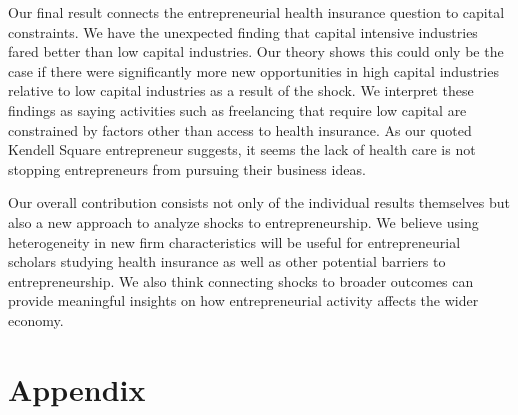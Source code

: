\documentclass[12pt]{article}
\begin{document}
Our final result connects the entrepreneurial health insurance question to capital constraints. We have the unexpected finding that capital intensive industries fared better than low capital industries. Our theory shows this could only be the case if there were significantly more new opportunities in high capital industries relative to low capital industries as a result of the shock. We interpret these findings as saying activities such as freelancing that require low capital are constrained by factors other than access to health insurance. As our quoted Kendell Square entrepreneur suggests, it seems the lack of health care is not stopping entrepreneurs from pursuing their business ideas. 

Our overall contribution consists not only of the individual results themselves but also a new approach to analyze shocks to entrepreneurship. We believe using heterogeneity in new firm characteristics will be useful for entrepreneurial scholars studying health insurance as well as other potential barriers to entrepreneurship. We also think connecting shocks to broader outcomes can provide meaningful insights on how entrepreneurial activity affects the wider economy. 

\begin{comment}

Our results point the way to future research in this area. Our results may be sensitive to for example the subsidy schedule based on income implemented in Massachusetts. In addition, more precise firm creation data sources may allow us to make stronger statements about the types of industries that benefited from health care reform.


Reasons why no result is plausible: 
People will do this anyway
Cost of insurance is not covered; still expensive. 
People disuaded small sub-sample of entrepreneurs, pre-existing conditions or those with kids but no spousal insurance or access to VC funds

However 
Long and Dahlen \footnote{Long Dahlen 2014} and Long, Stockly and Nordahl \footnote{2012} show insurance rates increased primarily among low income, childless adults. Not the demographic for entrepreneurs. 

\end{comment}

\newpage

\appendix
\section*{Appendix}
\end{document}
